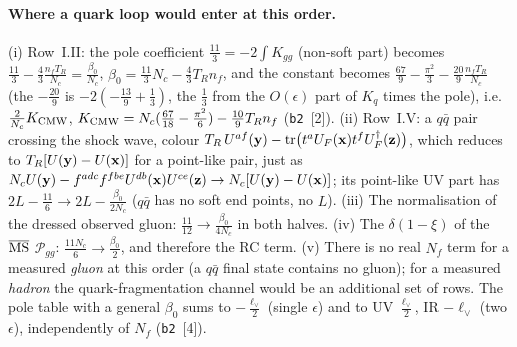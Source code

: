 \paragraph{Where a quark loop would enter at this order.} (i) Row~I.II: the pole coefficient $\frac{11}{3}=-2\int K_{gg}$ (non-soft part) becomes $\frac{11}{3}-\frac43\frac{n_fT_R}{N_c}=\frac{\beta_0}{N_c}$, $\beta_0=\frac{11}{3}N_c-\frac43T_Rn_f$, and the constant becomes $\frac{67}{9}-\frac{\pi^2}{3}-\frac{20}{9}\frac{n_fT_R}{N_c}$ (the $-\frac{20}{9}$ is $-2(-\frac{13}{9}+\frac13)$, the $\frac13$ from the $O(\epsilon)$ part of $K_q$ times the pole), i.e.\ $\frac{2}{N_c}K_{\rm CMW}$, $K_{\rm CMW}=N_c(\frac{67}{18}-\frac{\pi^2}{6})-\frac{10}{9}T_Rn_f$ (\texttt{b2}~[2]). (ii) Row~I.V: a $q\bar q$ pair crossing the shock wave, colour $T_R\,U^{af}(\mathbf{y})-\mathrm{tr}\big(t^aU_F(\mathbf{x})t^fU_F^\dagger(\mathbf{z})\big)$, which reduces to $T_R[U(\mathbf{y})-U(\mathbf{x})]$ for a point-like pair, just as $N_cU(\mathbf{y})-f^{adc}f^{fbe}U^{db}(\mathbf{x})U^{ce}(\mathbf{z})\to N_c[U(\mathbf{y})-U(\mathbf{x})]$; its point-like UV part has $2L-\frac{11}{6}\to2L-\frac{\beta_0}{2N_c}$ ($q\bar q$ has no soft end points, no $L$). (iii) The normalisation of the dressed observed gluon: $\frac{11}{12}\to\frac{\beta_0}{4N_c}$ in both halves. (iv) The $\delta(1-\xi)$ of the $\overline{\rm MS}$ $\mathcal P_{gg}$: $\frac{11N_c}{6}\to\frac{\beta_0}{2}$, and therefore the RC term. (v) There is no real $N_f$ term for a measured \emph{gluon} at this order (a $q\bar q$ final state contains no gluon); for a measured \emph{hadron} the quark-fragmentation channel would be an additional set of rows. The pole table with a general $\beta_0$ sums to $-\frac{\ell_\vee}{2}$ (single $\epsilon$) and to UV $\frac{\ell_\vee}{2}$, IR $-\ell_\vee$ (two $\epsilon$), independently of $N_f$ (\texttt{b2}~[4]).


